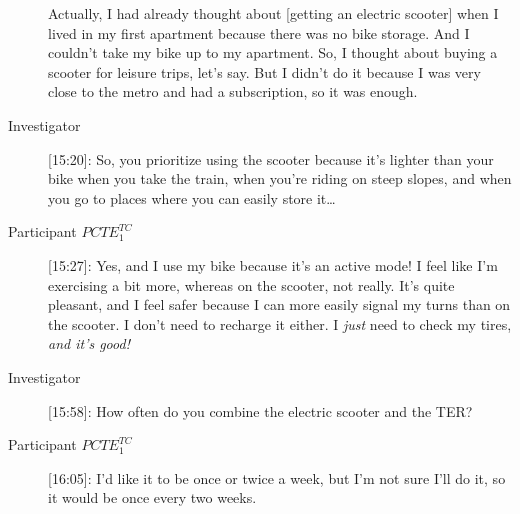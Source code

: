 \begin{description}
    Actually, I had already thought about [getting an electric scooter] when I lived in my first apartment because there was no bike storage. And I couldn’t take my bike up to my apartment. So, I thought about buying a scooter for leisure trips, let’s say. But I didn’t do it because I was very close to the metro and had a subscription, so it was enough. 
    \item[Investigator] [15:20]: So, you prioritize using the scooter because it’s lighter than your bike when you take the train, when you’re riding on steep slopes, and when you go to places where you can easily store it\dots
    \item[Participant \(PCTE^{TC}_{1}\)] [15:27]: Yes, and I use my bike because it’s an active mode! I feel like I’m exercising a bit more, whereas on the scooter, not really. It’s quite pleasant, and I feel safer because I can more easily signal my turns than on the scooter. I don’t need to recharge it either. I \textsl{just} need to check my tires, \textsl{and it’s good!}
    \item[Investigator] [15:58]: How often do you combine the electric scooter and the \acrshort{TER}?
    \item[Participant \(PCTE^{TC}_{1}\)] [16:05]: I’d like it to be once or twice a week, but I’m not sure I’ll do it, so it would be once every two weeks.%


\end{description}
